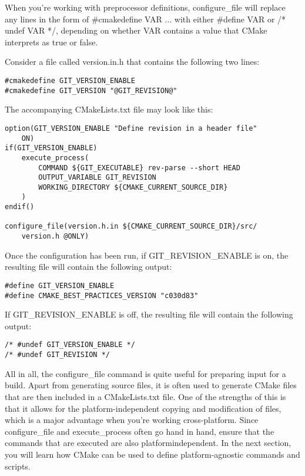 When you're working with preprocessor definitions, configure\_file will replace any lines in the form of \#cmakedefine VAR ... with either \#define VAR or /* undef VAR */, depending on whether VAR contains a value that CMake interprets as true or false.

Consider a file called version.in.h that contains the following two lines:

\begin{lstlisting}[style=styleCMake]
#cmakedefine GIT_VERSION_ENABLE
#cmakedefine GIT_VERSION "@GIT_REVISION@"
\end{lstlisting}

The accompanying CMakeLists.txt file may look like this:

\begin{lstlisting}[style=styleCMake]
option(GIT_VERSION_ENABLE "Define revision in a header file"
	ON)
if(GIT_VERSION_ENABLE)
	execute_process(
		COMMAND ${GIT_EXECUTABLE} rev-parse --short HEAD
		OUTPUT_VARIABLE GIT_REVISION
		WORKING_DIRECTORY ${CMAKE_CURRENT_SOURCE_DIR}
	)
endif()

configure_file(version.h.in ${CMAKE_CURRENT_SOURCE_DIR}/src/
	version.h @ONLY)
\end{lstlisting}

Once the configuration has been run, if GIT\_REVISION\_ENABLE is on, the resulting file will contain the following output:

\begin{lstlisting}[style=styleCXX]
#define GIT_VERSION_ENABLE
#define CMAKE_BEST_PRACTICES_VERSION "c030d83"
\end{lstlisting}

If GIT\_REVISION\_ENABLE is off, the resulting file will contain the following output:

\begin{lstlisting}[style=styleCXX]
/* #undef GIT_VERSION_ENABLE */
/* #undef GIT_REVISION */
\end{lstlisting}

All in all, the configure\_file command is quite useful for preparing input for a build. Apart from generating source files, it is often used to generate CMake files that are then included in a CMakeLists.txt file. One of the strengths of this is that it allows for the platform-independent copying and modification of files, which is a major advantage when you're working cross-platform. Since configure\_file and execute\_process often go hand in hand, ensure that the commands that are executed are also platformindependent. In the next section, you will learn how CMake can be used to define platform-agnostic commands and scripts.























